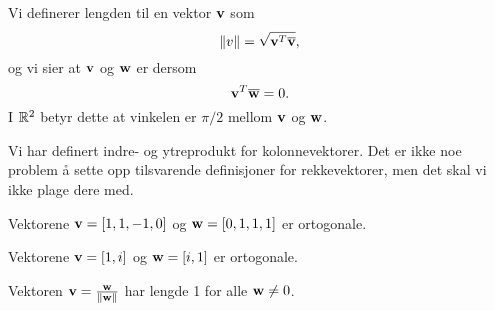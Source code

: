  Vi definerer lengden til en vektor $\mathbf{v}$ som 
 \[
 \|v\|=\sqrt{\mathbf{v}^T\overline{\mathbf{v}}},
 \]
 og vi sier at $\mathbf{v}$ og $\mathbf{w}$ er  dersom 
\[
 \mathbf{v}^T  \overline{\mathbf{w}} = 0.
 \] 
I $\mathbb{R}^2$ betyr dette at vinkelen er $\pi/2$ mellom $\mathbf{v}$ og $\mathbf{w}$. 

Vi har definert indre- og ytreprodukt for kolonnevektorer. Det er ikke noe problem å sette opp tilsvarende definisjoner for rekkevektorer, men det skal vi ikke plage dere med.

 \begin{ex}
 Vektorene $\mathbf{v}=[1,1,-1,0]$ og $\mathbf{w}=[0,1,1,1]$ er ortogonale. 
 \end{ex}

 \begin{ex}
 Vektorene $\mathbf{v}=[1,i]$ og $\mathbf{w}=[i,1]$ er ortogonale. 
 \end{ex}

 \begin{ex}
 Vektoren $\mathbf{v}=\frac{\mathbf{w}}{\|\mathbf{w}\|}$ har lengde 1 for alle $\mathbf{w} \neq 0$.
 \end{ex}
 
